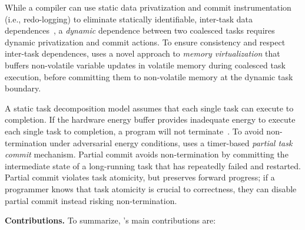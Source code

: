While a compiler can use static data privatization and commit instrumentation
(i.e., redo-logging) to eliminate statically identifiable, inter-task data
dependences~\citep{alpaca}, a \emph{dynamic} dependence between two coalesced
tasks requires dynamic privatization and commit actions. 
%
To ensure consistency and respect inter-task dependences, \sys uses a novel
approach to \emph{memory virtualization} that buffers non-volatile variable
updates in volatile memory during coalesced task execution, before committing
them to non-volatile memory at the dynamic task boundary.
%

A static task decomposition model assumes that each
single task can execute to completion.  If the hardware energy buffer provides
inadequate energy to execute each single task to completion, a program will not
terminate~\cite{cleancut_2018}. To avoid non-termination under adversarial 
energy conditions, \sys uses a timer-based {\em partial task commit} mechanism.
Partial commit avoids non-termination by committing the intermediate state of a long-running
task that has repeatedly failed and restarted.  Partial commit violates
task atomicity, but preserves forward progress; if a programmer knows that
task atomicity is crucial to correctness, they can disable partial commit
instead risking non-termination.

%

\textbf{Contributions.} To summarize, \sys's main contributions are: 


